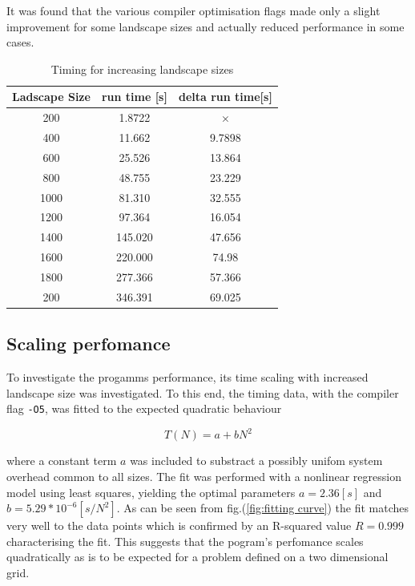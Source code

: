 It was found that the various compiler optimisation flags made only a slight improvement for some landscape sizes and actually reduced performance in some cases.


\begin{table}
\caption{Timing for increasing landscape sizes}
\label{tab: Size timing}
 \begin{center}
\begin{tabular}{|c|c|c|}
\hline
Ladscape Size & run time [s] & delta run time[s]\\
\hline
200 & 1.8722 & ×\\
\hline
400 & 11.662 & 9.7898\\
\hline
600 & 25.526 & 13.864\\
\hline
800 & 48.755 & 23.229\\
\hline
1000 & 81.310 & 32.555\\
\hline
1200 & 97.364 & 16.054\\
\hline
1400 & 145.020 & 47.656\\
\hline
1600 & 220.000 & 74.98\\
\hline
1800 & 277.366 & 57.366\\
\hline
200 & 346.391 & 69.025\\
\hline
\end{tabular}
\end{center}
\end{table}

\subsection{Scaling perfomance}
\label{subsec:scaling pefomance}

To investigate the progamms performance, its time scaling with increased landscape size was investigated.
To this end, the timing data, with the compiler flag  \texttt{-O5}, was fitted to the expected quadratic behaviour

\begin{equation}
 T(N)=a+bN^2
\label{eq:fitting curve}
\end{equation}

where a constant term $a$ was included to substract a possibly unifom system overhead common to all sizes.
The fit was performed with a nonlinear regression model using least squares, yielding the optimal parameters $a=2.36 [s]$ and $b=5.29*10^{-6} [s/N^2]$.
As can be seen from fig.(\ref{fig:fitting curve}) the fit matches very well to the data points which is confirmed by an R-squared value $R=0.999$ characterising the fit.
This suggests that the pogram's perfomance scales quadratically as is to be expected for a problem defined on a two dimensional grid. 

